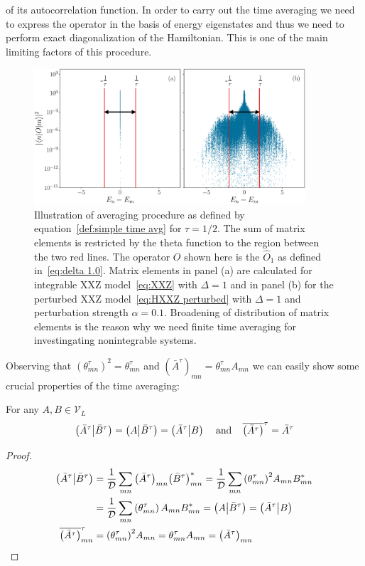 of its autocorrelation function. In order to carry out the time averaging we need to express the operator
in the basis of energy eigenstates and thus we need to perform exact diagonalization of the Hamiltonian.
This is one of the main limiting factors of this procedure.
\begin{figure}[htbp]
  \centering
  \includegraphics[width=0.9\textwidth]{Figures/cutoff_flat.pdf}
  \caption{Illustration of averaging procedure as defined by equation~\eqref{def:simple time avg}
  for \(\tau = 1/2\). The sum
  of matrix elements is restricted by the theta function to the region between the two red lines. 
  The operator \(O\) shown here is the \(\hat{O}_1\) as defined in~\eqref{eq:delta 1.0}.
  Matrix elements in panel (a) are calculated for integrable XXZ model~\eqref{eq:XXZ} with \(\Delta = 1\) and in
  panel (b) for the perturbed XXZ model~\eqref{eq:HXXZ perturbed} with \(\Delta = 1\) and perturbation strength
  \(\alpha = 0.1\). Broadening of distribution of matrix elements is the reason why we need finite time averaging
  for investingating nonintegrable systems.}
  \label{fig:cutoff}
\end{figure}
Observing that \({\left(\theta_{mn}^{\tau}\right)}^2 = \theta_{mn}^{\tau}\) and \({\left(\bar{A}^{\tau}\right)}_{mn} =
\theta_{mn}^{\tau} A_{mn}\) we can easily show some crucial properties of the time averaging:
\begin{proposition}
  For any \(A,B \in \mathcal{V}_L\)
  \begin{equation*}
    \left(\bar{A}^{\tau} \middle| \bar{B}^{\tau}\right) = \left(A \middle| \bar{B}^{\tau}\right) = \left(\bar{A}^{\tau} \middle| B\right)\;\;\;\;
    \textrm{and}\;\;\;\;
    \overline{\left(\bar{A}^{\tau}\right)}^{\tau} = \bar{A}^{\tau}
  \end{equation*}
  \label{prop:projection}
\end{proposition}
\begin{proof}
  \begin{align*}
    \left(\bar{A}^{\tau} \middle| \bar{B}^{\tau}\right)  & = \frac{1}{\mathcal{D}} \sum_{mn} {\left(\bar{A}^{\tau}\right)}_{mn}
    {\left(\bar{B}^{\tau}\right)}_{mn}^{\ast} = \frac{1}{\mathcal{D}} \sum_{mn} {\left(\theta_{mn}^{\tau}\right)}^2 A_{mn} B_{mn}^{\ast} \nonumber{}  \\
    & = \frac{1}{\mathcal{D}} \sum_{mn} \left(\theta_{mn}^{\tau}\right) A_{mn} B_{mn}^{\ast} =
        \left(A \middle| \bar{B}^{\tau}\right) = \left(\bar{A}^{\tau} \middle| B\right)\\
    \overline{\left(\bar{A}^{\tau}\right)}_{mn}^{\tau} & = {\left(\theta_{mn}^{\tau}\right)}^2 A_{mn} = \theta_{mn}^{\tau} A_{mn} = \left(\bar{A}^{\tau}\right)_{mn}
  \end{align*}  
\end{proof}
